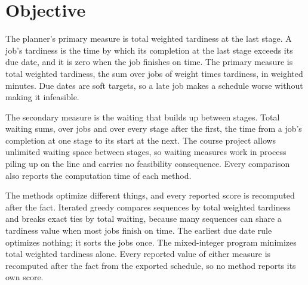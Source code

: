 \section{Objective}\label{sec:objective}

\sumpara The planner's primary measure is total weighted tardiness at the last stage. \sumparaend
\fin A job's tardiness is the time by which its completion at the last stage exceeds its due date, and it is zero when the job finishes on time. \fine
\fin The primary measure is total weighted tardiness, the sum over jobs of weight times tardiness, in weighted minutes. \fine
\fin Due dates are soft targets, so a late job makes a schedule worse without making it infeasible. \fine

\sumpara The secondary measure is the waiting that builds up between stages. \sumparaend
\fin Total waiting sums, over jobs and over every stage after the first, the time from a job's completion at one stage to its start at the next. \fine
\fin The course project allows unlimited waiting space between stages, so waiting measures work in process piling up on the line and carries no feasibility consequence. \fine
\fin Every comparison also reports the computation time of each method. \fine

\sumpara The methods optimize different things, and every reported score is recomputed after the fact. \sumparaend
\fin Iterated greedy compares sequences by total weighted tardiness and breaks exact ties by total waiting, because many sequences can share a tardiness value when most jobs finish on time. \fine
\fin The earliest due date rule optimizes nothing; it sorts the jobs once. \fine
\fin The mixed-integer program minimizes total weighted tardiness alone. \fine
\fin Every reported value of either measure is recomputed after the fact from the exported schedule, so no method reports its own score. \fine
